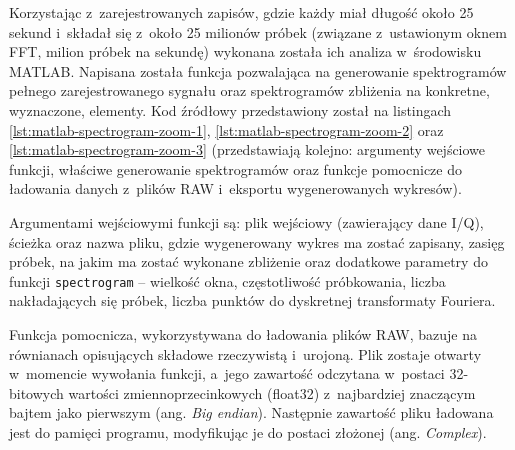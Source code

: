 Korzystając z~zarejestrowanych zapisów, gdzie każdy miał długość około 25 sekund i~składał się z~około 25 milionów
próbek (związane z~ustawionym oknem FFT, milion próbek na sekundę) wykonana została ich analiza w~środowisku MATLAB.
Napisana została funkcja pozwalająca na generowanie spektrogramów pełnego zarejestrowanego sygnału oraz spektrogramów
zbliżenia na konkretne, wyznaczone, elementy. Kod źródłowy przedstawiony został na listingach
\ref{lst:matlab-spectrogram-zoom-1}, \ref{lst:matlab-spectrogram-zoom-2} oraz \ref{lst:matlab-spectrogram-zoom-3}
(przedstawiają kolejno: argumenty wejściowe funkcji, właściwe generowanie spektrogramów oraz funkcje pomocnicze do
ładowania danych z~plików RAW i~eksportu wygenerowanych wykresów).







Argumentami wejściowymi funkcji są: plik wejściowy (zawierający dane I/Q), ścieżka oraz nazwa pliku, gdzie wygenerowany
wykres ma zostać zapisany, zasięg próbek, na jakim ma zostać wykonane zbliżenie oraz dodatkowe parametry do funkcji
\texttt{spectrogram} -- wielkość okna, częstotliwość próbkowania, liczba nakładających się próbek, liczba punktów do
dyskretnej transformaty Fouriera.

\FloatBarrier
Funkcja pomocnicza, wykorzystywana do ładowania plików RAW, bazuje na równianach opisujących składowe rzeczywistą
i~urojoną. Plik zostaje otwarty w~momencie wywołania funkcji, a~jego zawartość odczytana w~postaci 32-bitowych wartości
zmiennoprzecinkowych (float32) z~najbardziej znaczącym bajtem jako pierwszym (ang. \textsl{Big endian}). Następnie
zawartość pliku ładowana jest do pamięci programu, modyfikując je do postaci złożonej (ang. \textsl{Complex}).

